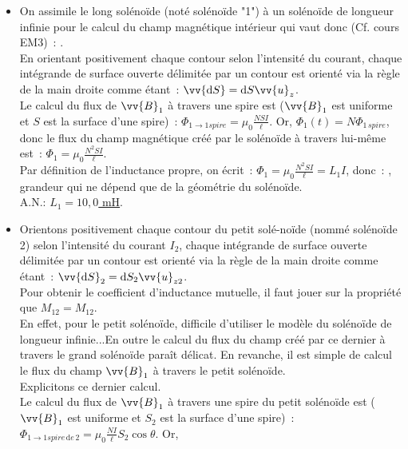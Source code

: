\documentclass{article}
\renewcommand\overrightarrow{\vv}
\begin{document}
\begin{itemize}
\item On assimile le long solénoïde (noté solénoïde "1") à un
solénoïde de longueur infinie pour le calcul du champ magnétique
intérieur qui vaut donc (Cf. cours EM3) :
\fbox{$\overrightarrow{B}_{1} = \mu_{0}\frac{ N
I}{\ell}\overrightarrow{u}_{z}$}. \\
En orientant positivement chaque contour selon l'intensité du
courant, chaque intégrande de surface ouverte délimitée par un
contour est orienté via la règle de la main droite comme étant :
$\overrightarrow{\mathrm{d}S} =\mathrm{d}S\overrightarrow{u}_{z}$. \\
Le calcul du flux de $\overrightarrow{B}_{1}$ à travers une spire
est  ($\overrightarrow{B}_{1}$ est uniforme et $S$ est la surface
d'une spire) : $\Phi_{1\longrightarrow 1 spire} =
\mu_{0}\frac{NSI}{\ell}$. Or, $\Phi_{1}(t) = N\Phi_{1\,spire}$, donc
le flux du champ magnétique créé par le solénoïde à travers lui-même
est : $\Phi_{1} = \mu_{0}\frac{N^{2}SI}{\ell}$.\\
Par définition de l'inductance propre, on écrit : $\Phi_{1}=
\mu_{0}\frac{N^{2}SI}{\ell} = L_{1}I$, donc : , grandeur qui ne dépend que de la
géométrie du solénoïde. \\
A.N.: \underline{$L_{1} = 10,0$ mH}.
\item Orientons positivement chaque contour du petit solé-noïde (nommé solénoïde 2) selon l'intensité du courant $I_{2}$,
chaque intégrande de surface ouverte délimitée par un contour est
orienté via la règle de la main droite comme étant :
$\overrightarrow{\mathrm{d}S}_{2} =\mathrm{d}S_{2}\overrightarrow{u}_{z2}$. \\
Pour obtenir le coefficient d'inductance mutuelle, il faut jouer sur
la propriété que $M_{12} = M_{12}$. \\
En effet, pour le petit solénoïde, difficile d'utiliser le modèle du
solénoïde de longueur infinie...En outre le calcul du flux du champ
créé par ce dernier à travers le grand solénoïde paraît délicat. En
revanche, il est simple de calcul le flux du champ
$\overrightarrow{B}_{1}$ à travers le petit solénoïde. \\
Explicitons ce dernier calcul. \\
Le calcul du flux de $\overrightarrow{B}_{1}$ à travers une spire du
petit solénoïde est  ($\overrightarrow{B}_{1}$ est uniforme et
$S_{2}$ est la surface d'une spire) : $\Phi_{1\longrightarrow 1
spire\, \mathrm{d}e\,2} = \mu_{0}\frac{NI}{\ell}S_{2}\cos\theta$. Or,

\end{itemize}
\end{document}
